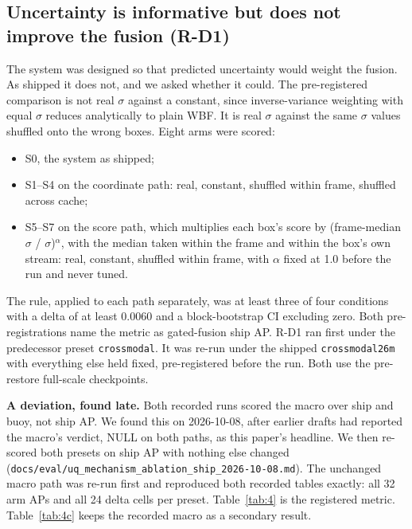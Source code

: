 \documentclass[10pt]{article}
\begin{document}
\subsection{Uncertainty is informative but does not improve the fusion (R-D1)}\label{sec:6.4}
The system was designed so that predicted uncertainty would weight the fusion. As shipped it does not, and we asked whether it could. The pre-registered comparison is not real $\sigma$ against a constant, since inverse-variance weighting with equal $\sigma$ reduces analytically to plain WBF. It is real $\sigma$ against the same $\sigma$ values shuffled onto the wrong boxes. Eight arms were scored:
\begin{itemize}
\item S0, the system as shipped;
\item S1--S4 on the coordinate path: real, constant, shuffled within frame, shuffled across cache;
\item S5--S7 on the score path, which multiplies each box's score by (frame-median $\sigma$ / $\sigma$)$^{\alpha}$, with the median taken within the frame and within the box's own stream: real, constant, shuffled within frame, with $\alpha$ fixed at 1.0 before the run and never tuned.
\end{itemize}

The rule, applied to each path separately, was at least three of four conditions with a delta of at least 0.0060 and a block-bootstrap CI excluding zero. Both pre-registrations name the metric as gated-fusion ship AP. R-D1 ran first under the predecessor preset \texttt{crossmodal}. It was re-run under the shipped \texttt{crossmodal26m} with everything else held fixed, pre-registered before the run. Both use the pre-restore full-scale checkpoints.

\textbf{A deviation, found late.} Both recorded runs scored the macro over ship and buoy, not ship AP. We found this on 2026-10-08, after earlier drafts had reported the macro's verdict, NULL on both paths, as this paper's headline. We then re-scored both presets on ship AP with nothing else changed (\texttt{docs/\allowbreak{}eval/\allowbreak{}uq\_\allowbreak{}mechanism\_\allowbreak{}ablation\_\allowbreak{}ship\_\allowbreak{}2026-10-08.md}). The unchanged macro path was re-run first and reproduced both recorded tables exactly: all 32 arm APs and all 24 delta cells per preset. Table~\ref{tab:4} is the registered metric. Table~\ref{tab:4c} keeps the recorded macro as a secondary result.
\end{document}

